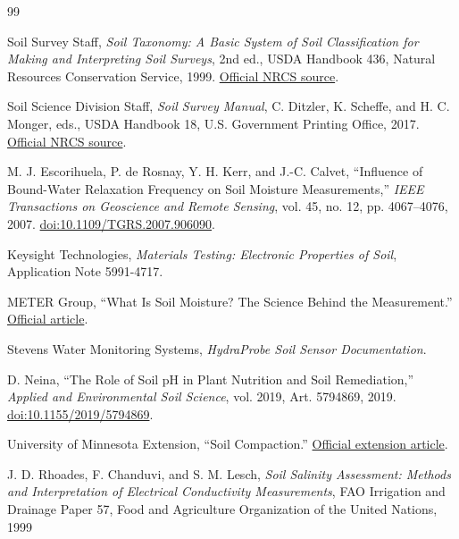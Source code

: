 \begin{thebibliography}{99}
\setlength{\itemsep}{0.45\baselineskip}\sloppy

Soil Survey Staff, \emph{Soil Taxonomy: A Basic System of Soil
Classification for Making and Interpreting Soil Surveys}, 2nd ed., USDA
Handbook 436, Natural Resources Conservation Service, 1999.
\href{https://www.nrcs.usda.gov/resources/guides-and-instructions/soil-taxonomy}{Official
NRCS source}.

Soil Science Division Staff, \emph{Soil Survey Manual}, C.
Ditzler, K. Scheffe, and H. C. Monger, eds., USDA Handbook 18, U.S.
Government Printing Office, 2017.
\href{https://www.nrcs.usda.gov/resources/guides-and-instructions/soil-survey-manual}{Official
NRCS source}.

M. J. Escorihuela, P. de Rosnay, Y. H. Kerr, and J.-C. Calvet,
``Influence of Bound-Water Relaxation Frequency on Soil Moisture
Measurements,'' \emph{IEEE Transactions on Geoscience and Remote
Sensing}, vol. 45, no. 12, pp. 4067--4076, 2007.
\href{https://doi.org/10.1109/TGRS.2007.906090}{doi:10.1109/TGRS.2007.906090}.

Keysight Technologies, \emph{Materials Testing: Electronic
Properties of Soil}, Application Note 5991-4717.

METER Group, ``What Is Soil Moisture? The Science Behind the
Measurement.''
\href{https://metergroup.com/measurement-insights/what-is-soil-moisture-the-science-behind-the-measurement/}{Official
article}.

Stevens Water Monitoring Systems, \emph{HydraProbe Soil Sensor
Documentation}.

D. Neina, ``The Role of Soil pH in Plant Nutrition and Soil
Remediation,'' \emph{Applied and Environmental Soil Science}, vol. 2019,
Art. 5794869, 2019.
\href{https://doi.org/10.1155/2019/5794869}{doi:10.1155/2019/5794869}.

University of Minnesota Extension, ``Soil Compaction.''
\href{https://extension.umn.edu/soil-management-and-health/soil-compaction}{Official
extension article}.

J. D. Rhoades, F. Chanduvi, and S. M. Lesch, \emph{Soil Salinity
Assessment: Methods and Interpretation of Electrical Conductivity
Measurements}, FAO Irrigation and Drainage Paper 57, Food and
Agriculture Organization of the United Nations, 1999


\end{thebibliography}
